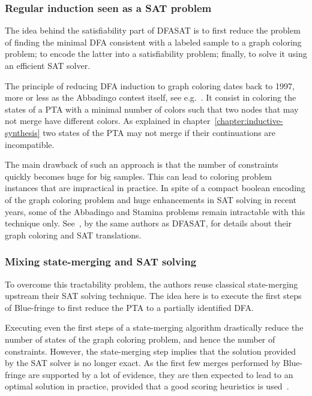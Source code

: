 \subsubsection*{Regular induction seen as a SAT problem}

The idea behind the satisfiability part of DFASAT is to first reduce the problem of finding the minimal DFA consistent with a labeled sample to a graph coloring problem; to encode the latter into a satisfiability problem; finally, to solve it using an efficient SAT solver. 

The principle of reducing DFA induction to graph coloring dates back to 1997, more or less as the Abbadingo contest itself, see e.g.~\cite{Coste:1997}. It consist in coloring the states of a PTA with a minimal number of colors such that two nodes that may not merge have different colors. As explained in chapter~\ref{chapter:inductive-synthesis} two states of the PTA may not merge if their continuations are incompatible.

The main drawback of such an approach is that the number of constraints quickly becomes huge for big samples. This can lead to coloring problem instances that are impractical in practice. In spite of a compact boolean encoding of the graph coloring problem and huge enhancements in SAT solving in recent years, some of the Abbadingo and Stamina problems remain intractable with this technique only. See~\cite{Heule:2010}, by the same authors as DFASAT, for details about their graph coloring and SAT translations.

\subsubsection*{Mixing state-merging and SAT solving}

To overcome this tractability problem, the authors reuse classical state-merging upstream their SAT solving technique. The idea here is to execute the first steps of Blue-fringe to first reduce the PTA to a partially identified DFA. 

Executing even the first steps of a state-merging algorithm drastically reduce the number of states of the graph coloring problem, and hence the number of constraints. However, the state-merging step implies that the solution provided by the SAT solver is no longer exact. As the first few merges performed by Blue-fringe are supported by a lot of evidence, they are then expected to lead to an optimal solution in practice, provided that a good scoring heuristics is used~\cite{Heule:2010}. 

